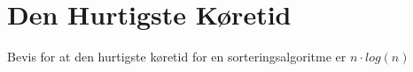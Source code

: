 \chapter{Den Hurtigste Køretid}
Bevis for at den hurtigste køretid for en sorteringsalgoritme er $n \cdot log(n)$


